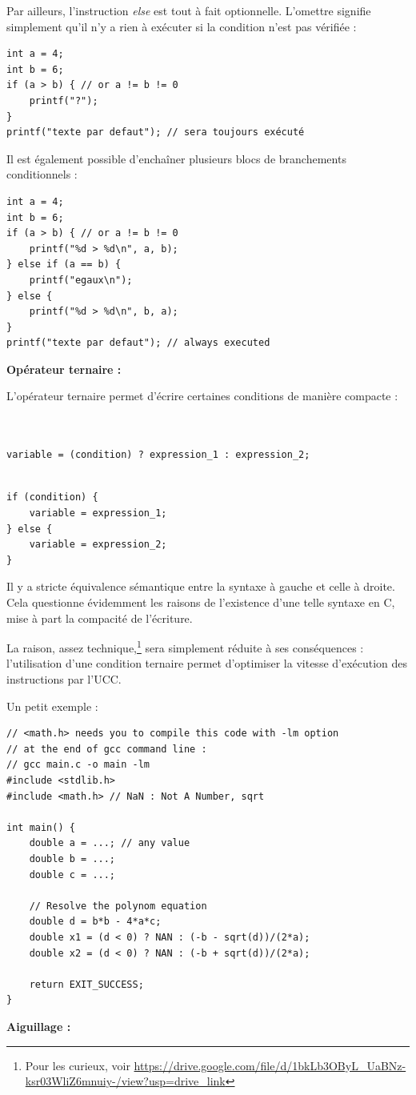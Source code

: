 \documentclass[../../../main.tex]{subfiles}
\begin{document}
Par ailleurs, l'instruction \textit{else} est tout à fait optionnelle. L'omettre signifie simplement qu'il n'y a rien à exécuter si la condition n'est pas vérifiée :
\begin{verbatim}
int a = 4;
int b = 6;
if (a > b) { // or a != b != 0
	printf("?");
}
printf("texte par defaut"); // sera toujours exécuté
\end{verbatim}
Il est également possible d'enchaîner plusieurs blocs de branchements conditionnels :
\begin{verbatim}
int a = 4;
int b = 6;
if (a > b) { // or a != b != 0
	printf("%d > %d\n", a, b);
} else if (a == b) {
	printf("egaux\n");
} else {
	printf("%d > %d\n", b, a);
}
printf("texte par defaut"); // always executed
\end{verbatim}
\textbf{Opérateur ternaire :}
 
L'opérateur ternaire permet d'écrire certaines conditions de manière compacte :
 
\begin{minipage}{0.65\textwidth}
\begin{verbatim}


variable = (condition) ? expression_1 : expression_2;


\end{verbatim}
\end{minipage}
\begin{minipage}{0.35\textwidth}
\begin{verbatim}
if (condition) {
	variable = expression_1;
} else {
	variable = expression_2;
}
\end{verbatim}
\end{minipage}
 
Il y a stricte équivalence sémantique entre la syntaxe à gauche et celle à droite. Cela questionne évidemment les raisons de l'existence d'une telle syntaxe en C, mise à part la compacité de l'écriture.
 
La raison, assez technique,\footnote{Pour les curieux, voir \url{https://drive.google.com/file/d/1bkLb3OByL_UaBNz-ksr03WliZ6mnuiy-/view?usp=drive_link}} sera simplement réduite à ses conséquences : l'utilisation d'une condition ternaire permet d'optimiser la vitesse d'exécution des instructions par l'UCC.
 
Un petit exemple :
\begin{verbatim}
// <math.h> needs you to compile this code with -lm option
// at the end of gcc command line :
// gcc main.c -o main -lm
#include <stdlib.h>
#include <math.h> // NaN : Not A Number, sqrt

int main() {
	double a = ...; // any value
	double b = ...;
	double c = ...;

	// Resolve the polynom equation
	double d = b*b - 4*a*c;
	double x1 = (d < 0) ? NAN : (-b - sqrt(d))/(2*a);
	double x2 = (d < 0) ? NAN : (-b + sqrt(d))/(2*a);

	return EXIT_SUCCESS;
}
\end{verbatim}
\textbf{Aiguillage :}
 
\end{document}
